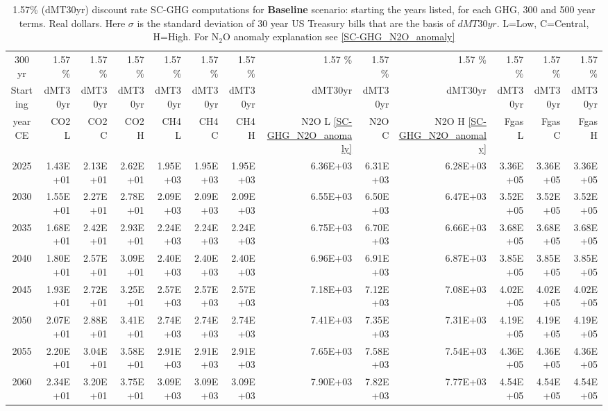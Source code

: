 \documentclass{article}
\begin{document}
\begin{table}
   \caption{1.57\% (dMT30yr) discount rate  SC-GHG computations for \textbf{Baseline} scenario: starting the years listed, for each GHG, 300 and 500 year terms. Real dollars. Here $\sigma$ is the standard deviation of 30 year US Treasury bills that are the basis of $dMT30yr$. L=Low, C=Central, H=High. For N$_2$O anomaly explanation see \ref{SC-GHG_N2O_anomaly}} 
\label{PVs_300_yearSCC_B1.57}
\small
\begin{tabular}{crrr|rrr|rrr|rrr}
300 yr   & 1.57 \%  & 1.57 \%  & 1.57 \%  & 1.57 \%  & 1.57 \%  & 1.57 \%  & 1.57 \%  & 1.57 \%  & 1.57 \%  & 1.57 \%  & 1.57 \%  & 1.57 \%  \\
Starting & dMT30yr  & dMT30yr  & dMT30yr  & dMT30yr  & dMT30yr  & dMT30yr  & dMT30yr  & dMT30yr  & dMT30yr  & dMT30yr  & dMT30yr  & dMT30yr  \\
year CE  & CO2 L    & CO2 C    & CO2 H    & CH4 L    & CH4 C    & CH4 H    & N2O L \ref{SC-GHG_N2O_anomaly}     & N2O C      & N2O H \ref{SC-GHG_N2O_anomaly}    & Fgas L   & Fgas C   & Fgas H   \\
2025     & 1.43E+01 & 2.13E+01 & 2.62E+01 & 1.95E+03 & 1.95E+03 & 1.95E+03 & 6.36E+03 & 6.31E+03 & 6.28E+03 & 3.36E+05 & 3.36E+05 & 3.36E+05 \\
2030     & 1.55E+01 & 2.27E+01 & 2.78E+01 & 2.09E+03 & 2.09E+03 & 2.09E+03 & 6.55E+03 & 6.50E+03 & 6.47E+03 & 3.52E+05 & 3.52E+05 & 3.52E+05 \\
2035     & 1.68E+01 & 2.42E+01 & 2.93E+01 & 2.24E+03 & 2.24E+03 & 2.24E+03 & 6.75E+03 & 6.70E+03 & 6.66E+03 & 3.68E+05 & 3.68E+05 & 3.68E+05 \\
2040     & 1.80E+01 & 2.57E+01 & 3.09E+01 & 2.40E+03 & 2.40E+03 & 2.40E+03 & 6.96E+03 & 6.91E+03 & 6.87E+03 & 3.85E+05 & 3.85E+05 & 3.85E+05 \\
2045     & 1.93E+01 & 2.72E+01 & 3.25E+01 & 2.57E+03 & 2.57E+03 & 2.57E+03 & 7.18E+03 & 7.12E+03 & 7.08E+03 & 4.02E+05 & 4.02E+05 & 4.02E+05 \\
2050     & 2.07E+01 & 2.88E+01 & 3.41E+01 & 2.74E+03 & 2.74E+03 & 2.74E+03 & 7.41E+03 & 7.35E+03 & 7.31E+03 & 4.19E+05 & 4.19E+05 & 4.19E+05 \\
2055     & 2.20E+01 & 3.04E+01 & 3.58E+01 & 2.91E+03 & 2.91E+03 & 2.91E+03 & 7.65E+03 & 7.58E+03 & 7.54E+03 & 4.36E+05 & 4.36E+05 & 4.36E+05 \\
2060     & 2.34E+01 & 3.20E+01 & 3.75E+01 & 3.09E+03 & 3.09E+03 & 3.09E+03 & 7.90E+03 & 7.82E+03 & 7.77E+03 & 4.54E+05 & 4.54E+05 & 4.54E+05 \\

\end{tabular}
\end{table}
\end{document}
